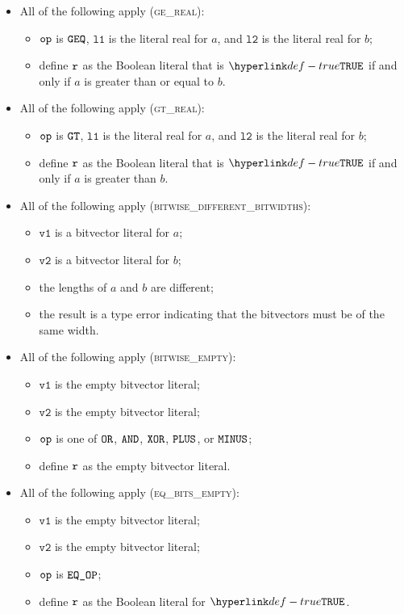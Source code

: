 \documentclass{book}
\newcommand\vvone[0]{\texttt{v1}}
\newcommand\vvtwo[0]{\texttt{v2}}
\newcommand\vlone[0]{\texttt{l1}}
\newcommand\vltwo[0]{\texttt{l2}}
\begin{document}
\begin{itemize}
  \item All of the following apply (\textsc{ge\_real}):
  \begin{itemize}
    \item $\texttt{op}$ is $\texttt{GEQ}$, $\vlone$ is the literal real for $a$, and $\vltwo$ is the literal real for $b$;
    \item define $\texttt{r}$ as the Boolean literal that is $\True$ if and only if $a$ is greater than or equal to $b$.
  \end{itemize}

  \item All of the following apply (\textsc{gt\_real}):
  \begin{itemize}
    \item $\texttt{op}$ is $\texttt{GT}$, $\vlone$ is the literal real for $a$, and $\vltwo$ is the literal real for $b$;
    \item define $\texttt{r}$ as the Boolean literal that is $\True$ if and only if $a$ is greater than $b$.
  \end{itemize}

  \item All of the following apply (\textsc{bitwise\_different\_bitwidths}):
  \begin{itemize}
    \item $\vvone$ is a bitvector literal for $a$;
    \item $\vvtwo$ is a bitvector literal for $b$;
    \item the lengths of $a$ and $b$ are different;
    \item the result is a type error indicating that the bitvectors must be of the same width.
  \end{itemize}

  \item All of the following apply (\textsc{bitwise\_empty}):
  \begin{itemize}
    \item $\vvone$ is the empty bitvector literal;
    \item $\vvtwo$ is the empty bitvector literal;
    \item $\texttt{op}$ is one of $\texttt{OR}$, $\texttt{AND}$, $\texttt{XOR}$, $\texttt{PLUS}$, or $\texttt{MINUS}$;
    \item define $\texttt{r}$ as the empty bitvector literal.
  \end{itemize}

  \item All of the following apply (\textsc{eq\_bits\_empty}):
  \begin{itemize}
    \item $\vvone$ is the empty bitvector literal;
    \item $\vvtwo$ is the empty bitvector literal;
    \item $\texttt{op}$ is $\texttt{EQ\_OP}$;
    \item define $\texttt{r}$ as the Boolean literal for $\True$.
  \end{itemize}


\end{itemize}
\end{document}
